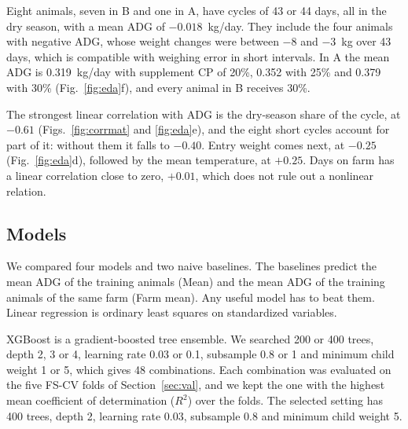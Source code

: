 \documentclass[12pt]{article}
\begin{document}
Eight animals, seven in B and one in A, have cycles of 43 or 44 days, all in the dry season, with a mean ADG of $-0.018$~kg/day. They include the four animals with negative ADG, whose weight changes were between $-8$ and $-3$~kg over 43 days, which is compatible with weighing error in short intervals. In A the mean ADG is 0.319~kg/day with supplement CP of 20\%, 0.352 with 25\% and 0.379 with 30\% (Fig.~\ref{fig:eda}f), and every animal in B receives 30\%.

The strongest linear correlation with ADG is the dry-season share of the cycle, at $-0.61$ (Figs.~\ref{fig:corrmat} and \ref{fig:eda}e), and the eight short cycles account for part of it: without them it falls to $-0.40$. Entry weight comes next, at $-0.25$ (Fig.~\ref{fig:eda}d), followed by the mean temperature, at $+0.25$. Days on farm has a linear correlation close to zero, $+0.01$, which does not rule out a nonlinear relation.

\subsection{Models}

We compared four models and two naive baselines. The baselines predict the mean ADG of the training animals (Mean) and the mean ADG of the training animals of the same farm (Farm mean). Any useful model has to beat them. Linear regression is ordinary least squares on standardized variables.

XGBoost \cite{chen2016xgboost} is a gradient-boosted tree ensemble. We searched 200 or 400 trees, depth 2, 3 or 4, learning rate 0.03 or 0.1, subsample 0.8 or 1 and minimum child weight 1 or 5, which gives 48 combinations. Each combination was evaluated on the five FS-CV folds of Section~\ref{sec:val}, and we kept the one with the highest mean coefficient of determination ($R^2$) over the folds. The selected setting has 400 trees, depth 2, learning rate 0.03, subsample 0.8 and minimum child weight 5.
\end{document}
